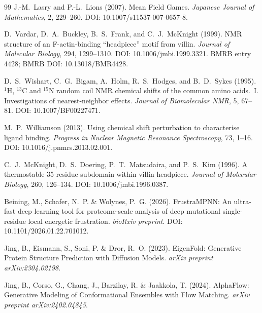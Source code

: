 \documentclass[12pt,a4paper]{article}
\theoremstyle{remark}
\begin{document}
\begin{thebibliography}{99}
J.-M.~Lasry and P.-L.~Lions (2007).
\newblock Mean Field Games.
\newblock \textit{Japanese Journal of Mathematics}, 2, 229--260.
\newblock DOI: 10.1007/s11537-007-0657-8.

D.~Vardar, D.~A.~Buckley, B.~S.~Frank, and C.~J.~McKnight (1999).
\newblock NMR structure of an F-actin-binding ``headpiece'' motif from villin.
\newblock \textit{Journal of Molecular Biology}, 294, 1299--1310.
\newblock DOI: 10.1006/jmbi.1999.3321.
\newblock BMRB entry 4428; BMRB DOI: 10.13018/BMR4428.

D.~S.~Wishart, C.~G.~Bigam, A.~Holm, R.~S.~Hodges, and B.~D.~Sykes (1995).
\newblock $^1$H, $^{13}$C and $^{15}$N random coil NMR chemical shifts of the common amino acids.~I. Investigations of nearest-neighbor effects.
\newblock \textit{Journal of Biomolecular NMR}, 5, 67--81.
\newblock DOI: 10.1007/BF00227471.

M.~P.~Williamson (2013).
\newblock Using chemical shift perturbation to characterise ligand binding.
\newblock \textit{Progress in Nuclear Magnetic Resonance Spectroscopy}, 73, 1--16.
\newblock DOI: 10.1016/j.pnmrs.2013.02.001.

C.~J.~McKnight, D.~S.~Doering, P.~T.~Matsudaira, and P.~S.~Kim (1996).
\newblock A thermostable 35-residue subdomain within villin headpiece.
\newblock \textit{Journal of Molecular Biology}, 260, 126--134.
\newblock DOI: 10.1006/jmbi.1996.0387.

Beining, M., Schafer, N.~P. \& Wolynes, P.~G. (2026).
\newblock FrustraMPNN: An ultra-fast deep learning tool for proteome-scale analysis of deep mutational single-residue local energetic frustration.
\newblock \textit{bioRxiv preprint}.
\newblock DOI: 10.1101/2026.01.22.701012.

Jing, B., Eismann, S., Soni, P. \& Dror, R.~O. (2023).
\newblock EigenFold: Generative Protein Structure Prediction with Diffusion Models.
\newblock \textit{arXiv preprint arXiv:2304.02198}.

Jing, B., Corso, G., Chang, J., Barzilay, R. \& Jaakkola, T. (2024).
\newblock AlphaFlow: Generative Modeling of Conformational Ensembles with Flow Matching.
\newblock \textit{arXiv preprint arXiv:2402.04845}.


\end{thebibliography}
\end{document}

